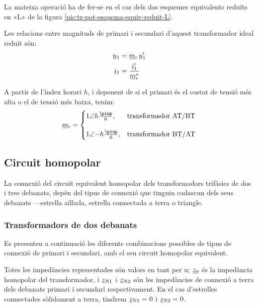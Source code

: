 La mateixa operació ha de fer-se en el cas dels dos esquemes equivalents reduïts en «L» de la figura \vref{pic:tr-pot-esquema-equiv-reduit-L}.

Les relacions entre magnituds de primari i secundari d'aquest transformador ideal reduït són:
\begin{subequations}
\begin{align}
    \cmplx{u}_1 &= \cmplx{m}\ped{r}\,\cmplx{u}'_1 \label{eq:UmU-reduit}\\
    \cmplx{i}_1 &= \frac{\cmplx{i}'_1}{\cmplx{m}^*\ped{r}} \label{eq:ImI-reduit}
\end{align}
\end{subequations}

A partir de l'índex horari $h$, i depenent de si el primari és el costat de tensió més alta o el de tensió més baixa, tenim:
\begin{equation}
\cmplx{m}\ped{r} = \begin{cases}
      1\angle h\frac{\piup}{6}, & \text{transformador AT/BT}\\[2.7ex]
      1\angle{-h}\frac{\piup}{6}, & \text{transformador BT/AT}
\end{cases}
\label{eq:rel-transf-cmplx-reduit}
\end{equation}


\subsection{Circuit homopolar}\label{sec:circuit_homopolar}

La connexió del circuit equivalent homopolar dels transformadors trifàsics de dos i tres debanats, depèn del tipus de connexió que tinguin cadascun dels seus debanats ---estrella aïllada, estrella connectada a terra o triangle.

\subsubsection{Transformadors de dos debanats}\label{sec:cir-hom-2-deb}

Es presenten a continuació les diferents combinacions possibles de tipus de connexió de primari i secundari, amb el seu circuit homopolar equivalent.

Totes les impedàncies representades són valors en tant per u; $\cmplx{z}_0$ és la impedància homopolar del transformador, i $\cmplx{z}\ped{N1}$ i $\cmplx{z}\ped{N2}$ són les impedàncies de connexió a terra dels debanats primari i secundari respectivament. En el cas d'estrelles connectades sòlidament a terra, tindrem $\cmplx{z}\ped{N1}=0$ i $\cmplx{z}\ped{N2}=0$.


